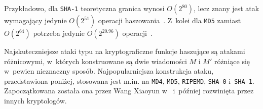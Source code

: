 Przykładowo, dla \texttt{SHA-1} teoretyczna granica wynosi $O(2^{80})$, lecz
znany jest atak wymagający jedynie $O(2^{51})$ operacji
haszowania~\cite{best_sha1_collision_attack}. Z~kolei dla \texttt{MD5} zamiast
$O(2^{64})$ potrzeba jedynie $O(2^{20.96})$
operacji~\cite{best_md5_collision_attack}.

Najskuteczniejsze ataki typu  na kryptograficzne funkcje
haszujące są atakami różnicowymi, w~których konstruowane są dwie wiadomości $M$
i $M'$ różniące się w~pewien nieznaczny sposób. Najpopularniejsza konstrukcja
ataku, przedstawiona poniżej, stosowana jest m.in. na \texttt{MD4},
\texttt{MD5}, \texttt{RIPEMD}, \texttt{SHA-0} i~\texttt{SHA-1}. Zapoczątkowana
została ona przez Wang Xiaoyun
w~\cite{wang_collision_attack1,wang_collision_attack2,wang_collision_attack3}
i~później rozwinięta przez innych kryptologów.

